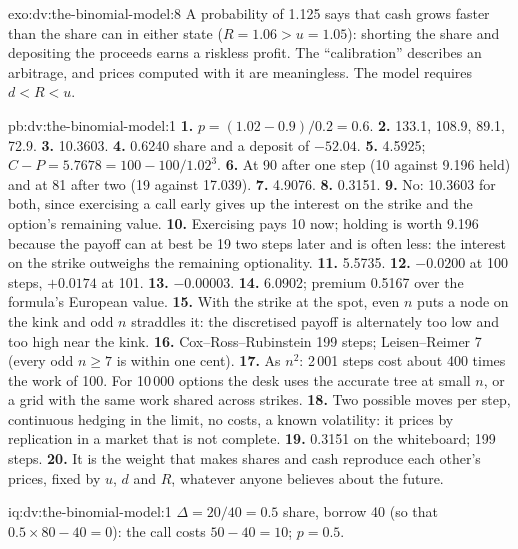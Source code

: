 \begin{solution}{exo:dv:the-binomial-model:8}
A probability of 1.125 says that cash grows faster than the share can in either
state ($R=1.06>u=1.05$): shorting the share and depositing the proceeds earns a
riskless profit. The ``calibration'' describes an arbitrage, and prices computed
with it are meaningless. The model requires $d<R<u$.
\end{solution}

\begin{solution}{pb:dv:the-binomial-model:1}
\textbf{1.} $p=(1.02-0.9)/0.2=0.6$.
\textbf{2.} 133.1, 108.9, 89.1, 72.9.
\textbf{3.} 10.3603.
\textbf{4.} 0.6240 share and a deposit of $-52.04$.
\textbf{5.} 4.5925; $C-P=5.7678=100-100/1.02^3$.
\textbf{6.} At 90 after one step (10 against 9.196 held) and at 81 after two (19
against 17.039).
\textbf{7.} 4.9076.
\textbf{8.} 0.3151.
\textbf{9.} No: 10.3603 for both, since exercising a call early gives up the
interest on the strike and the option's remaining value.
\textbf{10.} Exercising pays 10 now; holding is worth 9.196 because the payoff
can at best be 19 two steps later and is often less: the interest on the strike
outweighs the remaining optionality.
\textbf{11.} 5.5735.
\textbf{12.} $-0.0200$ at 100 steps, $+0.0174$ at 101.
\textbf{13.} $-0.00003$.
\textbf{14.} 6.0902; premium 0.5167 over the formula's European value.
\textbf{15.} With the strike at the spot, even $n$ puts a node on the kink and odd
$n$ straddles it: the discretised payoff is alternately too low and too high near
the kink.
\textbf{16.} Cox--Ross--Rubinstein 199 steps; Leisen--Reimer 7 (every odd $n\ge7$
is within one cent).
\textbf{17.} As $n^2$: 2\,001 steps cost about 400 times the work of 100. For
10\,000 options the desk uses the accurate tree at small $n$, or a grid with the
same work shared across strikes.
\textbf{18.} Two possible moves per step, continuous hedging in the limit, no
costs, a known volatility: it prices by replication in a market that is not
complete.
\textbf{19.} 0.3151 on the whiteboard; 199 steps.
\textbf{20.} It is the weight that makes shares and cash reproduce each other's
prices, fixed by $u$, $d$ and $R$, whatever anyone believes about the future.
\end{solution}

\begin{solution}{iq:dv:the-binomial-model:1}
$\Delta=20/40=0.5$ share, borrow 40 (so that $0.5\times80-40=0$): the call costs
$50-40=10$; $p=0.5$.
\end{solution}

